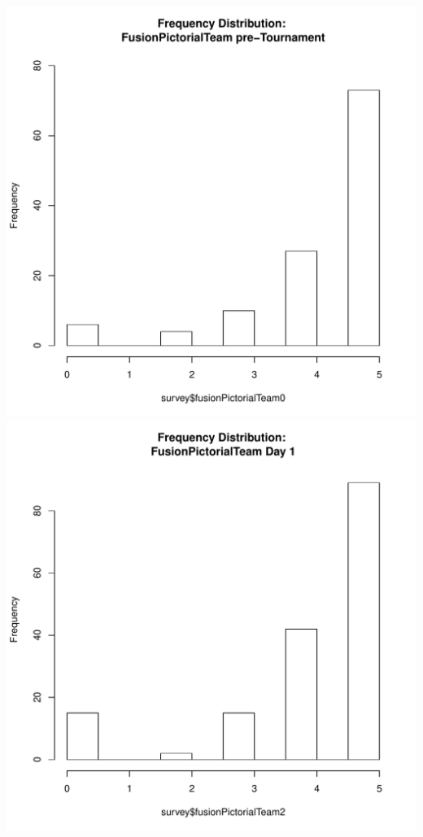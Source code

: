 \documentclass[12pt]{report}
\begin{document}
\clearpage
\includegraphics[scale =.4]{../images/distFusionPictorialTeamPre.pdf}
\includegraphics[scale =.4]{../images/distFusionPictorialTeamDay1.pdf}
\end{document}

